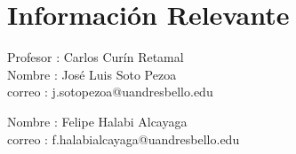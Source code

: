 \documentclass[10pt,letterpaper,twocolumn]{article}
\begin{document}
\section*{Información Relevante}

Profesor : Carlos Curín Retamal \\

Nombre : José Luis Soto Pezoa\\
correo : j.sotopezoa@uandresbello.edu

Nombre : Felipe Halabi Alcayaga\\
correo : f.halabialcayaga@uandresbello.edu
\end{document}
